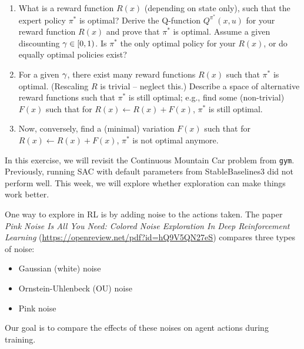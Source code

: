 \begin{enumerate}
\item What is a reward function $R(x)$ (depending on state only),
such that the expert policy $\pi^*$ is optimal? Derive the Q-function
$Q^{\pi^*}(x,u)$ for your reward function $R(x)$ and prove that
$\pi^*$ is optimal. Assume a given discounting $\gamma\in[0,1)$. Is
$\pi^*$ the only optimal policy for your $R(x)$, or do equally optimal
policies exist?


\item For a given $\gamma$, there exist many reward functions $R(x)$ such
that $\pi^*$ is optimal. (Rescaling $R$ is trivial -- neglect this.) Describe a space of alternative reward
functions such that $\pi^*$ is still optimal; e.g., find some
(non-trivial) $F(x)$ such
that for $R(x) \gets R(x) + F(x)$, $\pi^*$ is still optimal.



\item Now, conversely, find a (minimal) variation $F(x)$ such
that for $R(x) \gets R(x) + F(x)$, $\pi^*$ is not optimal anymore.


\end{enumerate}



In this exercise, we will revisit the Continuous Mountain Car problem from \texttt{gym}. Previously, running SAC with default parameters from StableBaselines3 did not perform well. This week, we will explore whether exploration can make things work better.

One way to explore in RL is by adding noise to the actions taken. The paper \textit{Pink Noise Is All You Need: Colored Noise Exploration In Deep Reinforcement Learning} ({\urlfont\url{https://openreview.net/pdf?id=hQ9V5QN27eS}}) compares three types of noise:
\begin{itemize}
\item Gaussian (white) noise
\item Ornstein-Uhlenbeck (OU) noise
\item Pink noise
\end{itemize}
Our goal is to compare the effects of these noises on agent actions during training.

